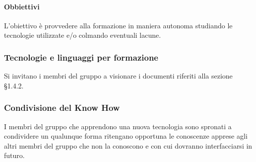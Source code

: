 			\paragraph{Obbiettivi}
				L'obiettivo è provvedere alla formazione in maniera autonoma studiando le tecnologie utilizzate e/o colmando eventuali lacune.
		\subsubsection{Tecnologie e linguaggi per formazione}
			Si invitano i membri del gruppo a visionare i documenti riferiti alla sezione §1.4.2.
		\subsubsection{Condivisione del Know How}
			I membri del gruppo che apprendono una nuova tecnologia sono spronati a condividere un qualunque forma ritengano opportuna le conoscenze apprese agli altri membri del gruppo che non la conoscono e con cui dovranno interfacciarsi in futuro.




			
			
			
			
			
			
			
			
			
			
			
			
			
			
			
			